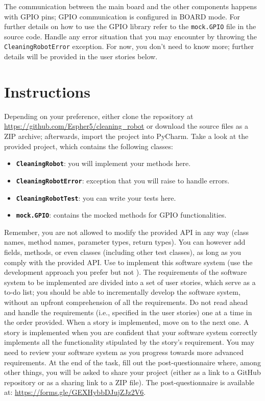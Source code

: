 The communication between the main board and the other components happens with GPIO pins; GPIO communication is configured in BOARD mode. For further details on how to use the GPIO library refer to the \texttt{mock.GPIO} file in the source code.
Handle any error situation that you may encounter by throwing the \texttt{CleaningRobotError} exception.
For now, you don't need to know more; further details will be provided in the user stories below.

\section{Instructions}
Depending on your preference, either clone the repository at \url{https://github.com/Espher5/cleaning_robot} or download the source files as a ZIP archive; afterwards, import the project into PyCharm. 
Take a look at the provided project, which contains the following classes: 
\begin{itemize}
    \item \textbf{\texttt{CleaningRobot}}: you will implement your methods here.
    \item \textbf{\texttt{CleaningRobotError}}: exception that you will raise to handle errors.
    \item \textbf{\texttt{CleaningRobotTest}}: you can write your tests here.
    \item \textbf{\texttt{mock.GPIO}}: contains the mocked methods for GPIO functionalities.
\end{itemize}


Remember, you are not allowed to modify the provided API in any way (\ie class names, method names, parameter types, return types). You can however add fields, methods, or even classes (including other test classes), as long as you comply with the provided API.
Use \notdd to implement this software system (\ie use the development approach you prefer but not \tdd).
The requirements of the software system to be implemented are divided into a set of user stories, which serve as a to-do list; you should be able to incrementally develop the software system, without an upfront comprehension of all the requirements. Do not read ahead and handle the requirements (i.e., specified in the user stories) one at a time in the order provided.
When a story is implemented, move on to the next one. A story is implemented when you are confident that your software system correctly implements all the functionality stipulated by the story's requirement. You may need to review your software system as you progress towards more advanced requirements.
At the end of the task, fill out the post-questionnaire where, among other things, you will be asked to share your project (either as a link to a GitHub repository or as a sharing link to a ZIP file). The post-questionnaire is available at: \url{https://forms.gle/GEXHybbDJujZJz2V6}.


